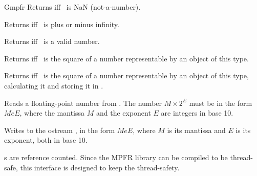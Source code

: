 \begin{ccRefClass} {Gmpfr}
        {Returns  iff \ccVar~is NaN (not-a-number).}

        {Returns  iff \ccVar~is plus or minus infinity.}

        {Returns  iff \ccVar~is a valid number.}

        {Returns  iff \ccVar~is the square of a number
        representable by an object of this type.}

        {Returns  iff \ccVar~is the square of a number
        representable by an object of this type, calculating it and storing
        it in .}



        {Reads a floating-point number from . The number
        \(M \times 2^E\) must be in the form \(MeE\), where the mantissa
        \(M\) and the exponent \(E\) are integers in base 10.}

        {Writes  to the ostream , in the form
        \(MeE\), where \(M\) is its mantissa and \(E\) is its exponent,
        both in base 10.}


\ccImplementation
{}s are reference counted. Since the MPFR library can be compiled
to be thread-safe, this interface is designed to keep the thread-safety.

\ccSeeAlso
{}\\

\end{ccRefClass} 

